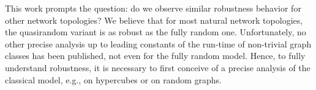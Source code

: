 \documentclass[12pt]{article}
\begin{document}
{This work prompts the question: do we observe similar robustness behavior for other network topologies? We believe that for most natural network topologies, the quasirandom variant is as robust as the fully random one. Unfortunately, no other precise analysis up to leading constants of the run-time of non-trivial graph classes has been published, not even for the fully random model. Hence, to fully understand robustness, it is necessary to first conceive of a precise analysis of the classical model, e.g., on hypercubes or on random graphs.
}



\end{document}
